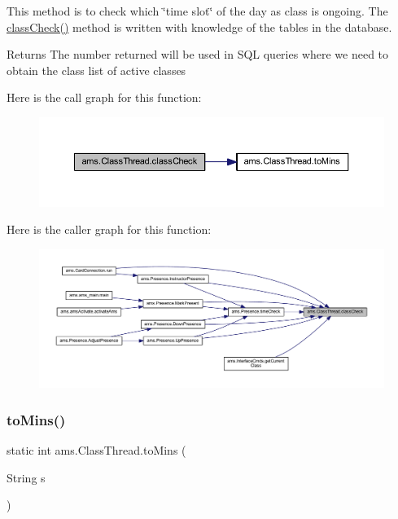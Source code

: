 This method is to check which \char`\"{}time slot\char`\"{} of the day as class is ongoing. The \mbox{\hyperlink{classams_1_1_class_thread_a7b05781a31721bb8ee9f4c40203bef72}{class\+Check()}} method is written with knowledge of the tables in the database. \begin{DoxyReturn}{Returns}
The number returned will be used in S\+QL queries where we need to obtain the class list of active classes 
\end{DoxyReturn}
Here is the call graph for this function\+:\nopagebreak
\begin{figure}[H]
\begin{center}
\leavevmode
\includegraphics[width=350pt]{classams_1_1_class_thread_a7b05781a31721bb8ee9f4c40203bef72_cgraph}
\end{center}
\end{figure}
Here is the caller graph for this function\+:\nopagebreak
\begin{figure}[H]
\begin{center}
\leavevmode
\includegraphics[width=350pt]{classams_1_1_class_thread_a7b05781a31721bb8ee9f4c40203bef72_icgraph}
\end{center}
\end{figure}
\mbox{\label{classams_1_1_class_thread_a6cf57979f8aee94a4b4c5d46525bb76d}} 
\subsubsection{\texorpdfstring{toMins()}{toMins()}}
{\footnotesize\ttfamily static int ams.\+Class\+Thread.\+to\+Mins (\begin{DoxyParamCaption}\item[{String}]{s }\end{DoxyParamCaption})\hspace{0.3cm}{\ttfamily [static]}}

